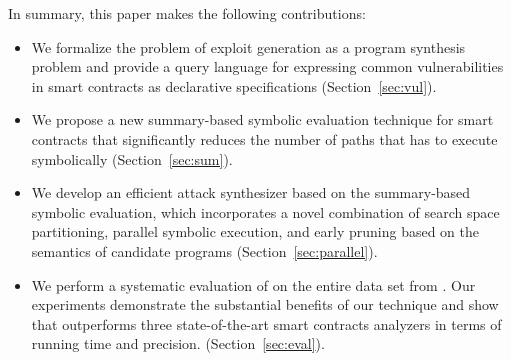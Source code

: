 In summary, this paper makes the following contributions:
\begin{itemize}
\item We formalize the problem of exploit generation as a program synthesis problem 
and provide a query language for expressing common vulnerabilities in smart contracts as declarative
specifications (Section~\ref{sec:vul}).
\item We propose a new summary-based symbolic evaluation technique for smart contracts that significantly reduces the number of paths that \toolname has to execute symbolically (Section~\ref{sec:sum}).
\item We develop an efficient attack synthesizer based on the summary-based symbolic 
evaluation, which incorporates a novel combination of search space partitioning, parallel
symbolic execution, and early pruning based on the semantics of
candidate programs (Section~\ref{sec:parallel}).
\item We perform a systematic evaluation of \toolname on the entire data set
from \etherscan. Our experiments demonstrate the substantial benefits of our
technique and show that \toolname outperforms three state-of-the-art smart
contracts analyzers in terms of running time and precision.
(Section~\ref{sec:eval}).
\end{itemize}
